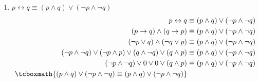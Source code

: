 \documentclass[10pt,letterpaper]{article}
\begin{document}
\begin{enumerate}
\begin{enumerate}
            \item $p \leftrightarrow q \equiv (p \land q) \lor (\neg p \land \neg q)$
                \begin{equation*} \begin{split} \begin{aligned}
                    p \leftrightarrow q
                        &\equiv
                    (p \land q) \lor (\neg p \land \neg q) \\
                    (p \rightarrow q) \land (q \rightarrow p)
                        &\equiv
                    (p \land q) \lor (\neg p \land \neg q) \\
                    (\neg p \lor q) \land (\neg q \lor p)
                        &\equiv
                    (p \land q) \lor (\neg p \land \neg q) \\
                    (\neg p \land \neg q) \lor (\neg p \land p) \lor (q \land \neg q) \lor (q \land p)
                        &\equiv
                    (p \land q) \lor (\neg p \land \neg q) \\
                    (\neg p \land \neg q) \lor 0 \lor 0 \lor (q \land p)
                        &\equiv
                    (p \land q) \lor (\neg p \land \neg q) \\
                    \tcboxmath{
                        (p \land q) \lor (\neg p \land \neg q)
                            \equiv (p \land q)
                        \lor (\neg p \land \neg q)
                    }
                \end{aligned} \end{split} \end{equation*}
        \end{enumerate}
\end{enumerate}
\end{document}
